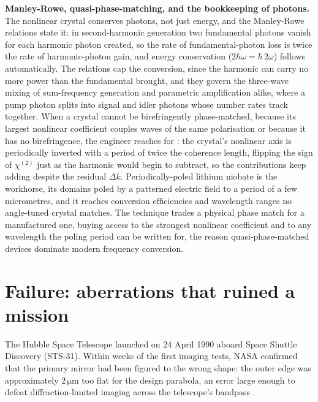 \begin{mastery}
\textbf{Manley-Rowe, quasi-phase-matching, and the bookkeeping of photons.} The
nonlinear crystal conserves photons, not just energy, and the Manley-Rowe
relations state it: in second-harmonic generation two fundamental photons vanish
for each harmonic photon created, so the rate of fundamental-photon loss is twice
the rate of harmonic-photon gain, and energy conservation ($2\hbar\omega =
\hbar\,2\omega$) follows automatically. The relations cap the conversion, since
the harmonic can carry no more power than the fundamental brought, and they govern
the three-wave mixing of sum-frequency generation and parametric amplification
alike, where a pump photon splits into signal and idler photons whose number rates
track together. When a crystal cannot be birefringently phase-matched, because its
largest nonlinear coefficient couples waves of the same polarisation or because it
has no birefringence, the engineer reaches for :
the crystal's nonlinear axis is periodically inverted with a period of twice the
coherence length, flipping the sign of $\chi^{(2)}$ just as the harmonic would
begin to subtract, so the contributions keep adding despite the residual
$\Delta k$. Periodically-poled lithium niobate is the workhorse, its domains poled
by a patterned electric field to a period of a few micrometres, and it reaches
conversion efficiencies and wavelength ranges no angle-tuned crystal matches. The
technique trades a physical phase match for a manufactured one, buying access to
the strongest nonlinear coefficient and to any wavelength the poling period can be
written for, the reason quasi-phase-matched devices dominate modern frequency
conversion.
\end{mastery}

\section{Failure: aberrations that ruined a mission}

The Hubble Space Telescope launched on 24 April 1990 aboard Space
Shuttle Discovery (STS-31). Within weeks of the first imaging tests,
NASA confirmed that the primary mirror had been figured to the wrong
shape: the outer edge was approximately $2\,\si{\micro\meter}$ too
flat for the design parabola, an error large enough to defeat
diffraction-limited imaging across the telescope's bandpass
\cite{acc:nasa-hubble-optical-systems-1990}.

